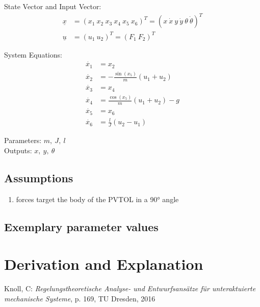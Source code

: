 \documentclass[10pt,a4paper]{article}
\begin{document}
	State Vector and Input Vector:
	\begin{align*}
		\underline{x} &= (x_1 \ x_2 \ x_3 \ x_4 \ x_5 \ x_6)^T = (x \ \dot{x} \ y \ \dot{y} \ \theta \ \dot{\theta})^T \\
		\underline{u} &= (u_1 \ u_2)^T = (F_1 \ F_2)^T
	\end{align*}

	\noindent System Equations:	
	\begin{subequations}
	\begin{align}
		\dot{x_1} &= x_2 	\\ 
		\dot{x_2} &= -\frac{\sin(x_5)}{m} (u_1 + u_2)  \\
		\dot{x_3} &= x_4 \\
		\dot{x_4} &= \frac{\cos(x_5)}{m} (u_1 + u_2) - g \\
		\dot{x_5} &= x_6 \\
		\dot{x_6} &= \frac{l}{J} (u_2 - u_1)
	\end{align}
	\end{subequations}

	\noindent
	Parameters: $m, ~J, ~l$ %
	\\
	Outputs:  $x, ~y, ~\theta$%
	
	
	\subsection{Assumptions} %
		\begin{enumerate} %
			\item forces target the body of the PVTOL in a 90° angle
		\end{enumerate}
	
	
	\subsection{Exemplary parameter values}
	

	
	\section{Derivation and Explanation} %
	
	
	\begin{thebibliography}{10}		
		Knoll, C: 
		\textit{Regelungstheoretische Analyse- und Entwurfsansätze für unteraktuierte mechanische Systeme}, p. 169, TU Dresden, 2016
	\end{thebibliography}
\end{document}
